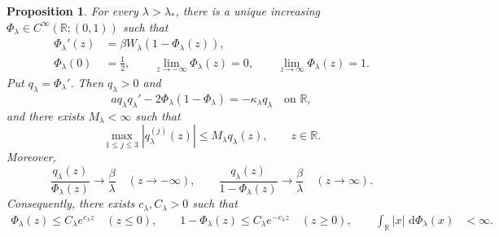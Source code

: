 \documentclass[12pt,preprint]{amsart}
\numberwithin{equation}{section}
\theoremstyle{plain}
\newtheorem{proposition}[theorem]{Proposition}
\theoremstyle{definition}
\newcommand{\dd}{\,\mathrm d}
\begin{document}
\begin{proposition}
\label{prop:full-line-distribution}
For every $\lambda>\lambda_*$, there is a unique increasing
$\Phi_\lambda\in C^\infty(\mathbb R;(0,1))$ such that
\begin{equation}
\begin{aligned}
 \Phi_\lambda'(z)&=\beta W_\lambda(1-\Phi_\lambda(z)),\\
 \Phi_\lambda(0)&=\frac12,\qquad
 \lim_{z\to-\infty}\Phi_\lambda(z)=0, \qquad
 \lim_{z\to\infty}\Phi_\lambda(z)=1.
\end{aligned}
 \label{eq:Phi-phase-definition}
\end{equation}
Put $q_\lambda=\Phi_\lambda'$.  Then $q_\lambda>0$ and
\begin{equation}
 a q_\lambda q_\lambda'
 -2\Phi_\lambda(1-\Phi_\lambda)
 =-\kappa_\lambda q_\lambda
 \quad\text{on }\mathbb R,
 \label{eq:upper-profile-equation}
\end{equation}
and there exists $M_\lambda<\infty$ such that
\begin{equation}
 \max_{1\le j\le3}|q_\lambda^{(j)}(z)|
 \le M_\lambda q_\lambda(z),
 \qquad z\in\mathbb R.
 \label{eq:full-line-relative-bounds}
\end{equation}
Moreover,
\begin{equation}
 \frac{q_\lambda(z)}{\Phi_\lambda(z)}\longrightarrow\frac\beta\lambda
 \quad(z\to-\infty),
 \qquad
 \frac{q_\lambda(z)}{1-\Phi_\lambda(z)}\longrightarrow\frac\beta\lambda
 \quad(z\to\infty).
 \label{eq:full-line-tail-ratios}
\end{equation}
Consequently, there exists $c_\lambda,C_\lambda>0$ such that
\[
\begin{aligned}
 \Phi_\lambda(z)\le C_\lambda e^{c_\lambda z}
 \quad(z\le0),\qquad
 1-\Phi_\lambda(z)\le C_\lambda e^{-c_\lambda z}
 \quad(z\ge0),\qquad
 \int_{\mathbb R}|x|\,\dd\Phi_\lambda(x)&<\infty.
\end{aligned}
\]
\end{proposition}
\end{document}
